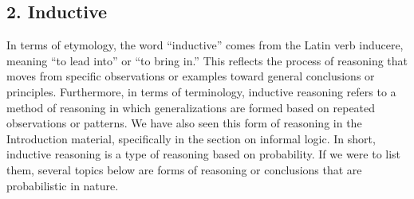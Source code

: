 \subsection{2. Inductive}\label{inductive}

In terms of etymology, the word ``inductive'' comes from the Latin verb
inducere, meaning ``to lead into'' or ``to bring in.'' This reflects the
process of reasoning that moves from specific observations or examples
toward general conclusions or principles. Furthermore, in terms of
terminology, inductive reasoning refers to a method of reasoning in
which generalizations are formed based on repeated observations or
patterns. We have also seen this form of reasoning in the Introduction
material, specifically in the section on informal logic. In short,
inductive reasoning is a type of reasoning based on probability. If we
were to list them, several topics below are forms of reasoning or
conclusions that are probabilistic in nature.

